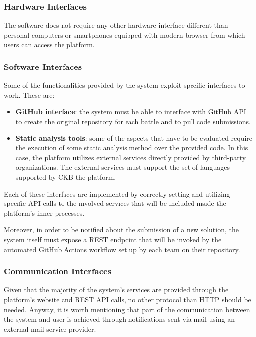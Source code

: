 \subsubsection{Hardware Interfaces}
The software does not require any other hardware interface different than personal computers or smartphones equipped with modern browser from which users can access the platform.
\subsubsection{Software Interfaces}
Some of the functionalities provided by the system exploit specific interfaces to work. These are:
\begin{itemize}
    \item \textbf{GitHub interface}: the system must be able to interface with GitHub API to create the original repository for each battle and to pull code submissions.
    \item \textbf{Static analysis tools}: some of the aspects that have to be evaluated require the execution of some static analysis method over the provided code. In this case, the platform utilizes external services directly provided by third-party organizations. The external services must support the set of languages supported by CKB the platform.
\end{itemize}
Each of these interfaces are implemented by correctly setting and utilizing specific API calls to the involved services that will be included inside the platform’s inner processes.

Moreover, in order to be notified about the submission of a new solution, the system itself must expose a REST endpoint that will be invoked by the automated GitHub Actions workflow set up by each team on their repository.
\subsubsection{Communication Interfaces}
Given that the majority of the system's services are provided through the platform's website and REST API calls, no other protocol than HTTP should be needed. Anyway, it is worth mentioning that part of the communication between the system and user is achieved through notifications sent via mail using an external mail service provider.

